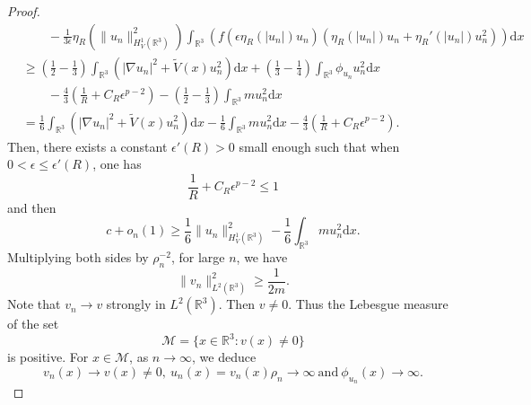 \documentclass[12pt]{amsart}
\numberwithin{equation}{section}
\theoremstyle{definition}
\begin{document}
\begin{proof}
\begin{equation*}
\begin{split}
        &\quad\quad-\frac{1}{3\epsilon}\eta _{R}\left ( \|u_n\|^{2}_{H^1_{V}(\mathbb{R}^3)} \right )\int_{\mathbb{R}^{3}}\left(f\left (\epsilon \eta _{R}\left ( \left | u_n\right | \right ) u_n\right )\left (\eta _{R}\left ( \left | u_n\right | \right ) u_n +\eta _{R}'\left ( \left | u_n\right |\right )u_n^2 \right )\right)\text{d}x\\
		&\geq\left(\frac{1}{2}-\frac{1}{3}\right)\int_{\mathbb R^3}\left(|\nabla u_n|^2+\tilde V(x)u_n^2\right)\text{d}x+\left(\frac{1}{3}-\frac{1}{4}\right)\int_{\mathbb R^3}\phi_{u_n}u_n^2\text{d}x\\
		&\quad\quad-\frac{4}{3}\left(\frac{1}{R}+C_{R}\epsilon ^{p-2}\right)-\left(\frac{1}{2}-\frac{1}{3}\right)\int_{\mathbb{R}^3}m u^{2}_n\text{d}x\\
		&=\frac{1}{6}\int_{\mathbb R^3}\left(|\nabla u_n|^2+\tilde V(x)u_n^2\right)\text{d}x-\frac{1}{6}\int_{\mathbb{R}^3}m u^{2}_n\text{d}x-\frac{4}{3}\left(\frac{1}{R}+C_{R}\epsilon ^{p-2}\right).
	\end{split}\end{equation*}
Then, there exists a constant $\epsilon'(R)>0$ small enough such that when   $0<\epsilon\leq\epsilon'(R)$, one has
$$\frac{1}{R}+C_{R}\epsilon ^{p-2}\leq1 $$
and then
\begin{equation*}
	c+o_{n}(1)\geq \frac{1}{6}\|u_n\|^{2}_{H^{1}_{V}(\mathbb R^3)}- \frac{1}{6}\int_{\mathbb{R}^3}m u^{2}_n\text{d}x.
	\end{equation*}
Multiplying both sides by $\rho_{n}^{-2}$, for large $n$, we have 	
	$$\|v_n\|_{L^{2}(\mathbb{R}^3)}^{2}\geq \frac{1}{2m}.$$
Note that $v_n\to v$ strongly in $L^{2}(\mathbb{R}^3)$. Then $v\neq0$. Thus the Lebesgue measure of the set
$$\mathcal{M}=\{x\in\mathbb{R}^3:v(x)\neq 0\}$$
is positive. For $x\in\mathcal{M}$, as $n\to\infty$, we deduce
$$v_n(x)\to v(x)\neq 0,~u_{n}(x)=v_{n}(x)\rho_n\to\infty~\text{and}~\phi_{u_n}(x)\to\infty.$$


\end{proof}
\end{document}
